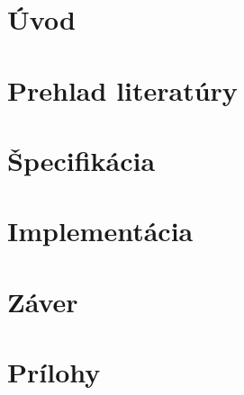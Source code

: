


\tableofcontents
\newpage

\chapter{Úvod}


\chapter{Prehlad literatúry}


\chapter{Špecifikácia}


\chapter{Implementácia}


\chapter{Záver}

\printbibliography
{}  %


\chapter*{Prílohy}   %

